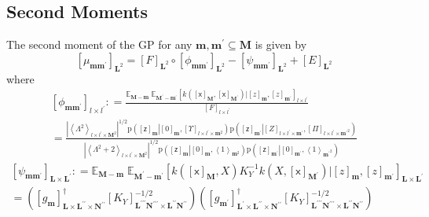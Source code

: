 \documentclass[preprint,12pt]{elsarticle}
\newcommand*{\M}[1]{\ensuremath{#1}\xspace}
\newcommand*{\x}{\times}
\newcommand*{\mi}[1]{\mathbf{#1}}
\newcommand*{\rv}[1]{\mathsf{#1}}
\newcommand*{\te}[2][]{\left\lbrack{#2}\right\rbrack_{#1}}
\newcommand*{\diag}[2][]{\left\langle{#2}\right\rangle_{#1}}
\newcommand*{\prob}[3]{\M{\mathrm{p}\!\left(\left.{#1}\right\vert{#2,#3}\right)}}
\newcommand*{\deq}{\M{\mathrel{\mathop:}=}}
\newcommand*{\evt}[3][]{\mathbb{E}_{#3}^{#1}\!#2}
\newcommand*{\modulus}[1]{\M{\left\lvert{#1}\right\rvert}}
\begin{document}
        \subsection{Second Moments} \label{sub:GPMom:Second}
        The second moment of the GP for any $\mi{m,m^{\prime}}\subseteq\mi{M}$ is given by
            \begin{equation} \label{eq:GPMom:Second}
                \te[\mi{L}^2]{\mu_{\mi{mm^{\prime}}}} = 
                \te[\mi{L}^2]{F} \circ \te[\mi{L}^2]{\phi_{\mi{mm^{\prime}}}} - \te[\mi{L}^2]{\psi_{\mi{mm^{\prime}}}} + \te[\mi{L}^2]{E}                        
            \end{equation}
            where
            \begin{multline*}
                \te[l\x l^{\prime}]{\phi_{\mi{mm^{\prime}}}}
                \deq \frac{\evt{\;\evt{\te[l\x l^{\prime}]{k\!\left(\te[\mi{M}]{\rv{x}},\te[\mi{M^{\prime}}]{\rv{x}}\right) \big\vert \te[\mi{m}]{z},\te[\mi{m^{\prime}}]{z}}}{\mi{M^{\prime}-m^{\prime}}}}{\mi{M-m}}}{\te[l\x l^{\prime}]{F}} \\
                = \frac
                {\modulus{\diag[l\x l^{\prime}\x\mi{M}^{2}]{\Lambda^{2}}}^{1/2} \prob{\te[\mi{m}]{\rv{z}}}{\te[\mi{m}]{0}}{\te[l\x l^{\prime}\x\mi{m}^2]{\Upsilon}}\prob{\te[\mi{m^{\prime}}]{\rv{z}}}{\te[l\x l^{\prime}\x \mi{m^{\prime}}]{Z}}{\te[l\x l^{\prime}\x\mi{m^{\prime}}^{2}]{\Pi}}}
                {\modulus{\diag[l\x l^{\prime}\x\mi{M}^2]{\Lambda^{2}+2}}^{1/2}
                \prob{\te[\mi{m}]{\rv{z}}}{\te[\mi{m}]{0}}{\diag[\mi{m}^{2}]{1}}\prob{\te[\mi{m^{\prime}}]{\rv{z}}}{\te[\mi{m^{\prime}}]{0}}{\diag[\mi{m^{\prime}}^{2}]{1}}}
            \end{multline*}
            \begin{multline*}
                \te[\mi{L\x L^{\prime}}]{\psi_{\mi{mm^{\prime}}}}
                \deq \evt{\;\evt{\te[\mi{L\x L^{\prime}}]{k\!\left(\te[\mi{M}]{\rv{x}},X\right) K_{Y}^{-1} k\!\left(X,\te[\mi{M^{\prime}}]{\rv{x}}\right) \big\vert \te[\mi{m}]{z},\te[\mi{m^{\prime}}]{z}}}{\mi{M^{\prime}-m^{\prime}}}}{\mi{M-m}} \\
                 = \left(\te[\mi{L\x L^{\prime\prime}\x N^{\prime\prime}}]{g_{\mi{m}}}^{\dagger}
                    \te[\mi{L^{\prime\prime\prime}N^{\prime\prime\prime}}\x\mi{L^{\prime\prime}N^{\prime\prime}}]{K_{Y}}^{-1/2}\right)
                \left(\te[\mi{L^{\prime}\x L^{\prime\prime}\x N^{\prime\prime}}]{g_{\mi{m^{\prime}}}}^{\dagger}
                    \te[\mi{L^{\prime\prime\prime}N^{\prime\prime\prime}}\x\mi{L^{\prime\prime}N^{\prime\prime}}]{K_{Y}}^{-1/2}\right)
            \end{multline*}
\end{document}
